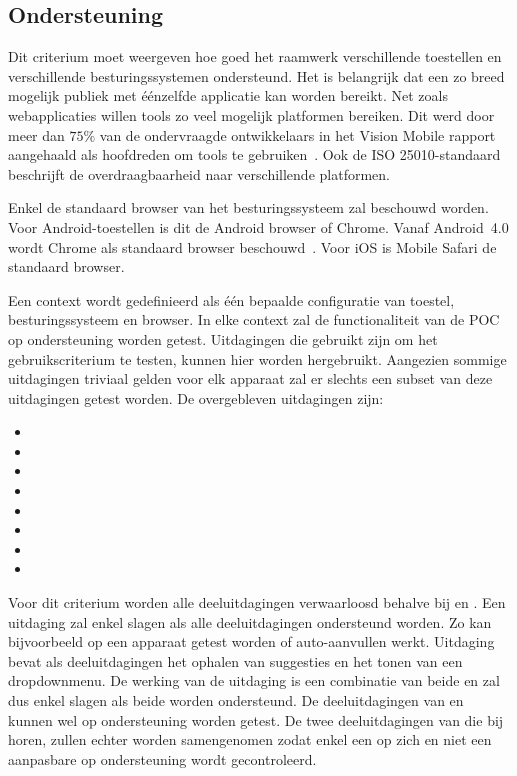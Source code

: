 
\subsection{Ondersteuning}
\label{sec:vergelijking-ondersteuning}
Dit criterium moet weergeven hoe goed het raamwerk verschillende toestellen en verschillende besturingssystemen ondersteund.
Het is belangrijk dat een zo breed mogelijk publiek met éénzelfde applicatie kan worden bereikt.
Net zoals webapplicaties willen  tools zo veel mogelijk platformen bereiken.
Dit werd door meer dan $75\%$ van de ondervraagde ontwikkelaars in het Vision Mobile rapport aangehaald als hoofdreden om  tools te gebruiken~\cite{Mobile2012}. 
Ook de ISO 25010-standaard beschrijft de overdraagbaarheid naar verschillende platformen.

Enkel de standaard browser van het besturingssysteem zal beschouwd worden.
Voor Android-toestellen is dit de Android browser of Chrome.  
Vanaf Android~4.0 wordt Chrome als standaard browser beschouwd~\cite{Wimberly2008}.
Voor iOS is Mobile Safari de standaard browser.

Een context wordt gedefinieerd als één bepaalde configuratie van toestel, besturingssysteem en browser.
In elke context zal de functionaliteit van de POC op ondersteuning worden getest.
Uitdagingen die gebruikt zijn om het gebruikscriterium te testen, kunnen hier worden hergebruikt.
Aangezien sommige uitdagingen triviaal gelden voor elk apparaat zal er slechts een subset van deze uitdagingen getest worden.
De overgebleven uitdagingen zijn:
\begin{itemize}
 \item {}
 \item {}
 \item {}
 \item {}
 \item {}
 \item {}
 \item {}
 \item {}
\end{itemize}
Voor dit criterium worden alle deeluitdagingen verwaarloosd behalve bij  en .
Een uitdaging zal enkel slagen als alle deeluitdagingen ondersteund worden.
Zo kan bijvoorbeeld op een apparaat getest worden of auto-aanvullen werkt.
Uitdaging  bevat als deeluitdagingen het ophalen van suggesties en het tonen van een dropdownmenu.
De werking van de uitdaging is een combinatie van beide en zal dus enkel slagen als beide worden ondersteund.
De deeluitdagingen van  en  kunnen wel op ondersteuning worden getest.
De twee deeluitdagingen van  die bij  horen, zullen echter worden samengenomen zodat enkel een  op zich en niet een aanpasbare  op ondersteuning wordt gecontroleerd.


